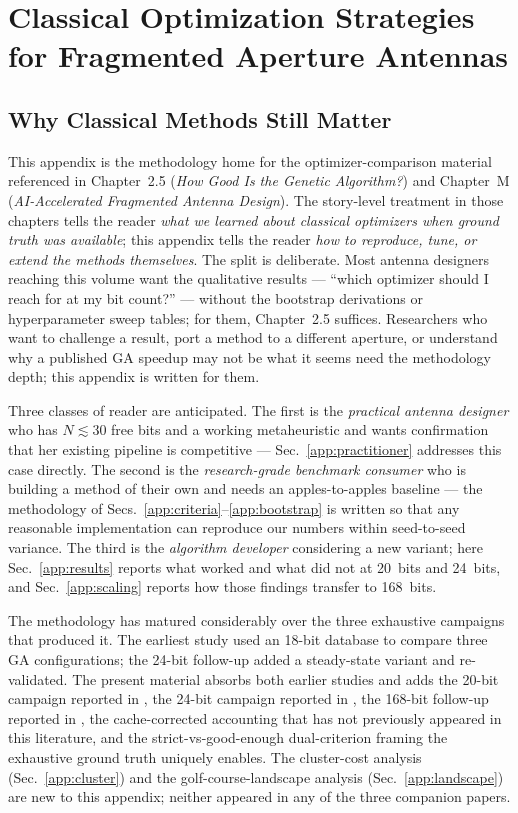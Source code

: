 \chapter{Classical Optimization Strategies for Fragmented Aperture Antennas}
\label{app:classical}

\section{Why Classical Methods Still Matter}
\label{app:why}

This appendix is the methodology home for the optimizer-comparison
material referenced in Chapter~2.5 (\emph{How Good Is the Genetic
Algorithm?}) and Chapter~M (\emph{AI-Accelerated Fragmented Antenna
Design}). The story-level treatment in those chapters tells the
reader \emph{what we learned about classical optimizers when ground
truth was available}; this appendix tells the reader \emph{how to
reproduce, tune, or extend the methods themselves}. The split is
deliberate. Most antenna designers reaching this volume want the
qualitative results --- ``which optimizer should I reach for at my
bit count?'' --- without the bootstrap derivations or hyperparameter
sweep tables; for them, Chapter~2.5 suffices. Researchers who want
to challenge a result, port a method to a different aperture, or
understand why a published GA speedup may not be what it seems
need the methodology depth; this appendix is written for them.

Three classes of reader are anticipated. The first is the
\emph{practical antenna designer} who has $N \!\lesssim\! 30$ free
bits and a working metaheuristic and wants confirmation that her
existing pipeline is competitive --- Sec.~\ref{app:practitioner}
addresses this case directly. The second is the
\emph{research-grade benchmark consumer} who is building a method
of their own and needs an apples-to-apples baseline --- the
methodology of Secs.~\ref{app:criteria}--\ref{app:bootstrap} is
written so that any reasonable implementation can reproduce our
numbers within seed-to-seed variance. The third is the
\emph{algorithm developer} considering a new variant; here
Sec.~\ref{app:results} reports what worked and what did not at
20~bits and 24~bits, and Sec.~\ref{app:scaling} reports how those
findings transfer to 168~bits.

The methodology has matured considerably over the three exhaustive
campaigns that produced it. The earliest study \cite{Maloney1999URSI}
used an 18-bit database to compare three GA configurations; the
24-bit follow-up \cite{Maloney2013Genetic24bit} added a steady-state
variant and re-validated. The present material absorbs both earlier
studies and adds the 20-bit campaign reported in
\cite{Maloney2026Paper1}, the 24-bit campaign reported in
\cite{Maloney2026Paper2}, the 168-bit follow-up reported in
\cite{Maloney2026Paper3}, the cache-corrected accounting that has
not previously appeared in this literature, and the strict-vs-good-enough
dual-criterion framing the exhaustive ground truth uniquely enables.
The cluster-cost analysis (Sec.~\ref{app:cluster}) and the
golf-course-landscape analysis (Sec.~\ref{app:landscape}) are new
to this appendix; neither appeared in any of the three companion
papers.

